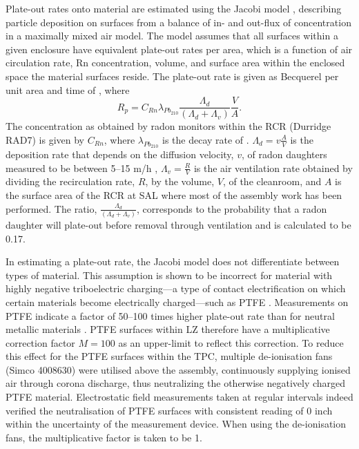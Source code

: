 Plate-out rates onto material are estimated using the Jacobi model \cite{jacobi1972activity, knutson1988modeling}, describing particle deposition on surfaces from a balance of in- and out-flux of concentration in a maximally mixed air model. The model assumes that all surfaces within a given enclosure have equivalent plate-out rates per area, which is a function of air circulation rate, Rn concentration, volume, and surface area within the enclosed space the material surfaces reside. The plate-out rate is given as Becquerel per unit area and time of \PbTOZ{}, where
%
\begin{equation}
    R_p=C_{Rn}\lambda_{Pb_{210}}\frac{\Lambda_d}{(\Lambda_d +\Lambda_v)}\frac{V}{A}.
    \label{eq:jacobi_eq}
\end{equation}
%
The \RnTTT{} concentration as obtained by radon monitors within the RCR (Durridge RAD7) is given by ${C_{Rn}}$, where ${\lambda_{Pb_{210}}}$ is the decay rate of \PbTOZ{}. ${{\Lambda_d =v\frac{A}{V}}}$ is the deposition rate that depends on the diffusion velocity, $v$, of radon daughters measured to be between 5--15 m/h \cite{knutson1988modeling}, ${{\Lambda_v = \frac{R}{V}}}$ is the air ventilation rate obtained by dividing the recirculation rate, $R$, by the volume, $V$, of the cleanroom, and $A$ is the surface area of the RCR at SAL where most of the assembly work has been performed. The ratio, ${\frac{\Lambda_d}{(\Lambda_d +\Lambda_v)}}$, corresponds to the probability that a radon daughter will plate-out before removal through ventilation and is calculated to be 0.17.

In estimating a plate-out rate, the Jacobi model does not differentiate between types of material. This assumption is shown to be incorrect for material with highly negative triboelectric charging---a type of contact electrification on which certain materials become electrically charged---such as PTFE \cite{zou:2019tde}. Measurements on PTFE indicate a factor of 50--100 times higher plate-out rate than for neutral metallic materials \cite{Morrison:2017xul}. PTFE surfaces within LZ therefore have a multiplicative correction factor ${M=100}$ as an upper-limit to reflect this correction. To reduce this effect for the PTFE surfaces within the TPC, multiple de-ionisation fans (Simco 4008630) were utilised above the assembly, continuously supplying ionised air through corona discharge, thus neutralizing the otherwise negatively charged PTFE material. Electrostatic field measurements taken at regular intervals indeed verified the neutralisation of PTFE surfaces with consistent reading of 0 \kilo\volt\per{}inch within the uncertainty of the measurement device. When using the de-ionisation fans, the multiplicative factor is taken to be 1.

